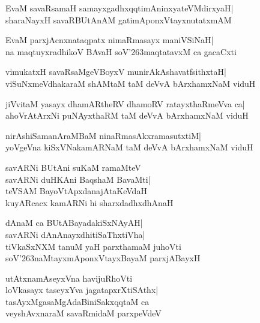 \documentclass[twoside,12pt,openright]{book}
\def\S{\char'263}
\newcounter{shloka}[chapter]
\begin{document}
\begin{shloka}%
EvaM savaRsamaH samayxgadhxqqtimAninxyateVMdirxyaH|\\
sharaNayxH savaRBUtAnAM gatimAponxVtayxnutatxmAM
\end{shloka}

\begin{shloka}%
EvaM parxjAcnxnataqpatx nimaRmasayx maniVSiNaH|\\
na maqtuyxradhikoV BAvaH soV\S maqtatavxM ca gacaCxti
\end{shloka}

\begin{shloka}%
vimukatxH savaRsaMgeVBoyxV munirAkAshavatfsithxtaH|\\
viSuNxmeVdhakaraM shAMtaM taM deVvA bArxhamxNaM viduH
\end{shloka}

\begin{shloka}%
jiVvitaM yasayx dhamARtheRV dhamoRV ratayxthaRmeVva ca|\\
ahoVrAtArxNi puNAyxthaRM taM deVvA bArxhamxNaM viduH
\end{shloka}

\begin{shloka}%
nirAshiSamanAraMBaM ninaRmasAkxramasutxtiM|\\ yoVgeVna kiSxVNakamARNaM
taM deVvA bArxhamxNaM viduH
\end{shloka}

\begin{shloka}%
savARNi BUtAni suKaM ramaMteV\\
savARNi duHKAni BaqshaM BavaMti|\\
teVSAM BayoVtApxdanajAtaKeVdaH\\
kuyARcacx kamARNi hi sharxdadhxdhAnaH
\end{shloka}

\begin{shloka}%
dAnaM ca BUtABayadakiSxNAyAH|\\
savARNi dAnAnayxdhitiSaThxtiVha|\\
tiVkaSxNXM tanuM yaH parxthamaM juhoVti\\
soV\S naMtayxmAponxVtayxBayaM parxjABayxH
\end{shloka}

\begin{shloka}%
utAtxnamAseyxVna havijuRhoVti\\
loVkasayx taseyxYva jagatapxrXtiSAthx|\\
tasAyxMgasaMgAdaBiniSakxqqtaM ca\\
veyshAvxnaraM savaRmidaM parxpeVdeV
\end{shloka}
\end{document}
